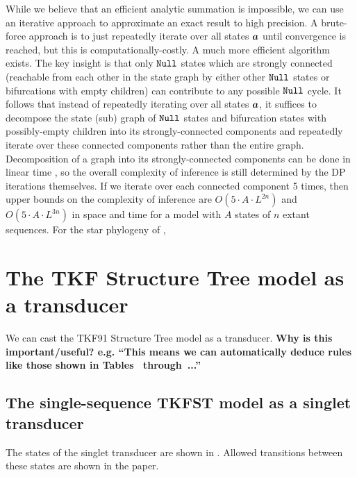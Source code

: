 \documentclass[10pt]{article}
\begin{document}
While we believe that an efficient analytic summation is impossible,
we can use an iterative approach to approximate an exact result to high precision.
A brute-force approach is to just repeatedly iterate over all states $\boldsymbol{a}$ until
convergence is reached, but this is computationally-costly.
A much more efficient algorithm exists.
The key insight is that only $\mathtt{Null}$ states which are strongly connected
(reachable from each other in the state graph by either other $\mathtt{Null}$ states
or bifurcations with empty children) can contribute to any possible $\mathtt{Null}$ cycle.
It follows that instead of repeatedly iterating over all states $\boldsymbol{a}$,
it suffices to decompose the state (sub) graph of $\mathtt{Null}$ states and bifurcation
states with possibly-empty children into its strongly-connected components
and repeatedly iterate over these connected components rather than the entire graph.
Decomposition of a graph into its strongly-connected components can
be done in linear time \cite{Tarjan1972},
so the overall complexity of inference is still determined by the DP iterations themselves.
If we iterate over each connected component 5 times, then upper bounds on 
the complexity of inference are
$O(5 \cdot A \cdot L^{2n})$ and $O(5 \cdot A \cdot L^{3n})$ in space and time for a model 
with $A$ states of $n$ extant sequences.
For the star phylogeny of , 


\newpage
\section{The TKF Structure Tree model as a transducer} 

We can cast the TKF91 Structure Tree model as a transducer.
{\bf Why is this important/useful? e.g. ``This means we can automatically deduce rules like those shown in Tables~ through~...''}

\subsection{The single-sequence TKFST model as a singlet transducer}

The states of the singlet transducer are shown in .
Allowed transitions between these states are shown in the paper.
\end{document}
